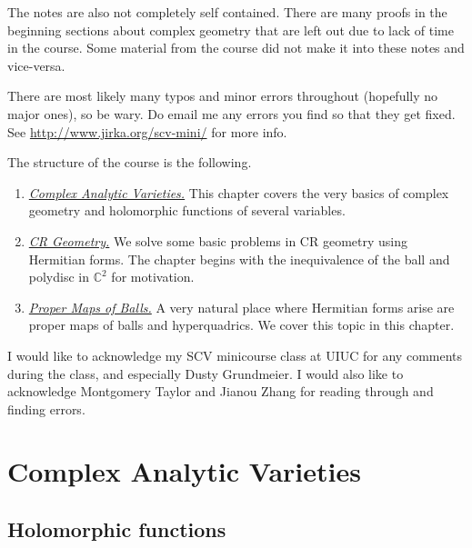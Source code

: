 \documentclass[12pt,openany]{book}
\newcommand{\C}{{\mathbb{C}}}
\theoremstyle{plain}
\theoremstyle{remark}
\theoremstyle{definition}
\theoremstyle{exercise}
\theoremstyle{example}
\begin{document}
The notes are also not completely self contained.  There are many proofs
in the beginning sections about complex geometry that are left
out due to lack of time in the course.  Some material from the course did not
make it into these notes and vice-versa.

There are most likely many typos and minor errors throughout (hopefully no
major ones), so be wary.  Do email me any errors you find so that they get
fixed.
See \url{http://www.jirka.org/scv-mini/} for more info.

The structure of the course is the following.

\begin{enumerate}
\item \emph{\hyperref[cav:chapter]{Complex Analytic Varieties.}}  This chapter covers the very
basics of complex geometry and holomorphic functions of several variables.
\item \emph{\hyperref[cr:chapter]{CR Geometry.}}  We solve some basic problems in CR geometry using
Hermitian forms.  The chapter begins with the inequivalence of the ball and
polydisc in $\C^2$ for motivation.
\item \emph{\hyperref[proper:chapter]{Proper Maps of Balls.}}  A very natural place where Hermitian
forms arise are proper maps of balls and hyperquadrics.  We cover this topic
in this chapter.
\end{enumerate}

I would like to acknowledge my SCV minicourse class at UIUC for any comments
during the class, and especially Dusty Grundmeier.  I would also like to
acknowledge Montgomery Taylor and Jianou Zhang for reading through and finding errors.


\chapter{Complex Analytic Varieties} \label{cav:chapter}


\section{Holomorphic functions} \label{sec:holfunc}
\end{document}
